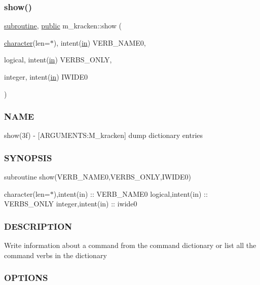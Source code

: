 \subsubsection{\texorpdfstring{show()}{show()}}
{\footnotesize\ttfamily \hyperlink{M__stopwatch_83_8txt_acfbcff50169d691ff02d4a123ed70482}{subroutine}, \hyperlink{M__stopwatch_83_8txt_a2f74811300c361e53b430611a7d1769f}{public} m\+\_\+kracken\+::show (\begin{DoxyParamCaption}\item[{\hyperlink{option__stopwatch_83_8txt_abd4b21fbbd175834027b5224bfe97e66}{character}(len=$\ast$), intent(\hyperlink{M__journal_83_8txt_afce72651d1eed785a2132bee863b2f38}{in})}]{V\+E\+R\+B\+\_\+\+N\+A\+M\+E0,  }\item[{logical, intent(\hyperlink{M__journal_83_8txt_afce72651d1eed785a2132bee863b2f38}{in})}]{V\+E\+R\+B\+S\+\_\+\+O\+N\+LY,  }\item[{integer, intent(\hyperlink{M__journal_83_8txt_afce72651d1eed785a2132bee863b2f38}{in})}]{I\+W\+I\+D\+E0 }\end{DoxyParamCaption})}



\subsubsection*{N\+A\+ME}

show(3f) -\/ \mbox{[}A\+R\+G\+U\+M\+E\+N\+TS\+:M\+\_\+kracken\mbox{]} dump dictionary entries 

\subsubsection*{S\+Y\+N\+O\+P\+S\+IS}

subroutine show(\+V\+E\+R\+B\+\_\+\+N\+A\+M\+E0,\+V\+E\+R\+B\+S\+\_\+\+O\+N\+L\+Y,\+I\+W\+I\+D\+E0)

character(len=$\ast$),intent(in) \+:\+: V\+E\+R\+B\+\_\+\+N\+A\+M\+E0 logical,intent(in) \+:\+: V\+E\+R\+B\+S\+\_\+\+O\+N\+LY integer,intent(in) \+:\+: iwide0 \subsubsection*{D\+E\+S\+C\+R\+I\+P\+T\+I\+ON}

Write information about a command from the command dictionary or list all the command verbs in the dictionary

\subsubsection*{O\+P\+T\+I\+O\+NS}

